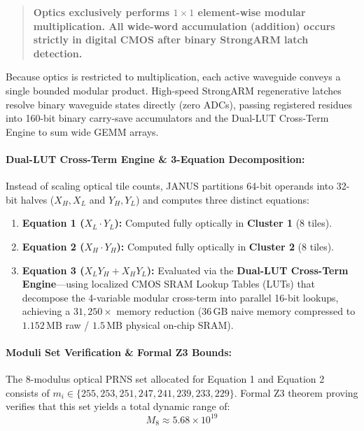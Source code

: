 \documentclass[journal]{IEEEtran}
\begin{document}
\begin{quote}
\textbf{Optics exclusively performs $1 \times 1$ element-wise modular multiplication. All wide-word accumulation (addition) occurs strictly in digital CMOS after binary StrongARM latch detection.}
\end{quote}

Because optics is restricted to multiplication, each active waveguide conveys a single bounded modular product. High-speed StrongARM regenerative latches resolve binary waveguide states directly (zero ADCs), passing registered residues into 160-bit binary carry-save accumulators and the Dual-LUT Cross-Term Engine to sum wide GEMM arrays.

\paragraph{\textbf{Dual-LUT Cross-Term Engine \& 3-Equation Decomposition:}}
Instead of scaling optical tile counts, JANUS partitions 64-bit operands into 32-bit halves ($X_H, X_L$ and $Y_H, Y_L$) and computes three distinct equations:

\begin{enumerate}
\item \textbf{Equation 1 ($X_L \cdot Y_L$):} Computed fully optically in \textbf{Cluster 1} (8 tiles).
\item \textbf{Equation 2 ($X_H \cdot Y_H$):} Computed fully optically in \textbf{Cluster 2} (8 tiles).
\item \textbf{Equation 3 ($X_L Y_H + X_H Y_L$):} Evaluated via the \textbf{Dual-LUT Cross-Term Engine}---using localized CMOS SRAM Lookup Tables (LUTs) that decompose the 4-variable modular cross-term into parallel 16-bit lookups, achieving a $31,250\times$ memory reduction ($36\,\mathrm{GB}$ naive memory compressed to $1.152\,\mathrm{MB}$ raw / $1.5\,\mathrm{MB}$ physical on-chip SRAM).
\end{enumerate}

\paragraph{\textbf{Moduli Set Verification \& Formal Z3 Bounds:}}
The 8-modulus optical PRNS set allocated for Equation 1 and Equation 2 consists of $m_i \in \{255, 253, 251, 247, 241, 239, 233, 229\}$. Formal Z3 theorem proving verifies that this set yields a total dynamic range of:
\begin{equation}
M_8 \approx 5.68 \times 10^{19}
\end{equation}
\end{document}
